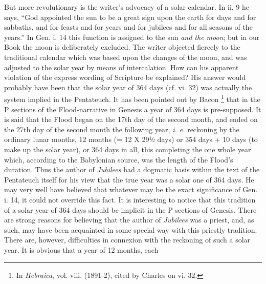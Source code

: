 But more revolutionary is the writer's advocacy of a solar calendar. In ii. 9 he says, ``God appointed the sun to be a great sign upon the earth for days and for sabbaths, and for feasts and for years and for jubilees and for all seasons of the years.'' In Gen. i. 14 this function is assigned to the sun \emph{and the moon}; but in our Book the moon is deliberately excluded. The writer objected fiercely to the traditional calendar which was based upon the changes of the moon, and was adjusted to the solar year by means of intercalation. How can his apparent violation of the express wording of Scripture be explained? His answer would probably have been that the solar year of 364 days (cf. vi. 32) was actually the system implied in the Pentateuch. It has been pointed out by Bacon \footnote{In \emph{Hebraica}, vol. viii. (1891-2), cited by Charles on vi. 32.} that in the P sections of the Flood-narrative in Genesis a year of 364 days is pre-supposed. It is said that the Flood began on the 17th day of the second month, and ended on the 27th day of the second month the following year, \emph{i. e.} reckoning by the ordinary lunar months, 12 months (= 12 X 29½ days) or 354 days + 10 days (to make up the solar year), or 364 days in all, this completing the one whole year which, according to the Babylonian source, was the length of the Flood's duration. Thus the author of \emph{Jubilees} had a dogmatic basis within the text of the Pentateuch itself for his view that the true year was a solar one of 364 days. He may very well have believed that whatever may be the exact significance of Gen. i. 14, it could not override this fact. It is interesting to notice that this tradition of a solar year of 364 days should be implicit in the P sections of Genesis. There are strong reasons for believing that the author of \emph{Jubilees} was a priest, and, as such, may have been acquainted in some special way with this priestly tradition. There are, however, difficulties in connexion with the reckoning of such a solar year. It is obvious that a year of 12 months, each

